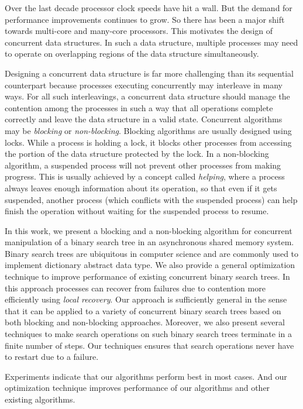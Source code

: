 Over the last decade processor clock speeds have hit a wall. But the demand for performance improvements continues to grow. So there has been a major shift towards multi-core and many-core processors. This motivates the design of concurrent data structures. In such a data structure, multiple processes may need to operate on overlapping regions of the data structure simultaneously.

Designing a concurrent data structure is far more challenging than its sequential counterpart because processes executing concurrently may interleave in many ways. For all such interleavings, a concurrent data structure should manage the contention among the processes in such a way that all operations complete correctly and leave the data structure in a valid state. Concurrent algorithms may be \emph{blocking} or \emph{non-blocking}. Blocking algorithms are usually designed using locks. While a process is holding a lock, it blocks other processes from accessing the portion of the data structure protected by the lock. In a non-blocking algorithm, a suspended process will not prevent other processes from making progress. This is usually achieved by a concept called \emph{helping}, where a process always leaves enough information about its operation, so that even if it gets suspended, another process (which conflicts with the suspended process) can help finish the operation without waiting for the suspended process to resume.

In this work, we present a blocking and a non-blocking algorithm for concurrent manipulation of a binary search tree in an asynchronous shared memory system. Binary search trees are ubiquitous in computer science and are commonly used to implement dictionary abstract data type. We also provide a general optimization technique to improve performance of existing concurrent binary search trees. In this approach processes can recover from failures due to contention more efficiently using \emph{local recovery}. Our approach is sufficiently general in the sense that it can be applied to a variety of concurrent binary search trees based on both blocking and non-blocking approaches. Moreover, we also present several techniques to make search operations on such binary search trees terminate in a finite number of steps. Our techniques ensures that search operations never have to restart due to a failure.

Experiments indicate that our algorithms perform best in most cases. And our optimization technique improves performance of our algorithms and other existing algorithms. 